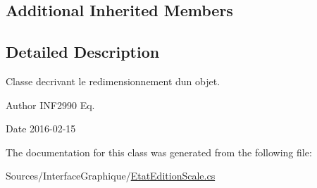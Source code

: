 \subsection*{Additional Inherited Members}


\subsection{Detailed Description}
Classe decrivant le redimensionnement d\textquotesingle{}un objet. 

\begin{DoxyAuthor}{Author}
I\+N\+F2990 Eq. 
\end{DoxyAuthor}
\begin{DoxyDate}{Date}
2016-\/02-\/15 
\end{DoxyDate}


The documentation for this class was generated from the following file\+:\begin{DoxyCompactItemize}
\item 
Sources/\+Interface\+Graphique/\hyperlink{_etat_edition_scale_8cs}{Etat\+Edition\+Scale.\+cs}\end{DoxyCompactItemize}
